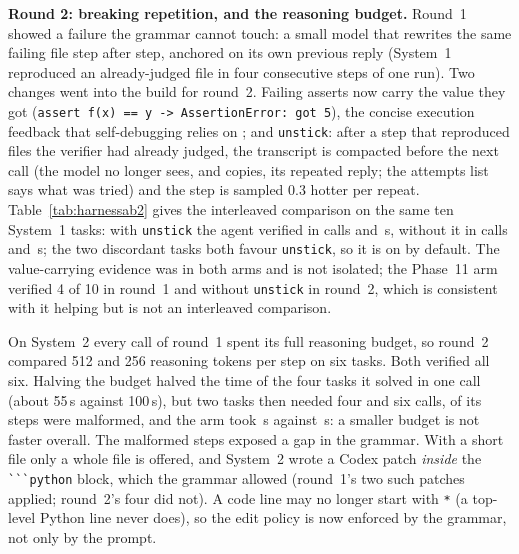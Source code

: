 \textbf{Round 2: breaking repetition, and the reasoning budget.} Round~1 showed
a failure the grammar cannot touch: a small model that rewrites the same failing
file step after step, anchored on its own previous reply (System~1 reproduced
an already-judged file in four consecutive steps of one run). Two changes went
into the build for round~2. Failing asserts now carry the value they got
(\texttt{assert f(x) == y -> AssertionError: got 5}), the concise execution
feedback that self-debugging relies on \cite{chen2024selfdebug}; and
\texttt{unstick}: after a step that reproduced files the verifier had already
judged, the transcript is compacted before the next call (the model no longer
sees, and copies, its repeated reply; the attempts list says what was tried) and
the step is sampled 0.3 hotter per repeat. Table~\ref{tab:harnessab2} gives the
interleaved comparison on the same ten System~1 tasks: with \texttt{unstick} the
agent verified \HABROneUVerified{} in \HABROneUCalls{} calls and \HABROneUWall\,s,
without it \HABROneNoUVerified{} in \HABROneNoUCalls{} calls and
\HABROneNoUWall\,s; the two discordant tasks both favour \texttt{unstick}, so it is
on by default. The value-carrying evidence was in both arms and is not isolated;
the Phase~11 arm verified 4 of 10 in round~1 and \HABROneNoUVerified{} without
\texttt{unstick} in round~2, which is consistent with it helping but is not an
interleaved comparison.

On System~2 every call of round~1 spent its full reasoning budget, so round~2
compared 512 and 256 reasoning tokens per step on six tasks. Both verified all
six. Halving the budget halved the time of the four tasks it solved in one call
(about 55\,s against 100\,s), but two tasks then needed four and six calls, \HABRTwoSmallMalformed{}
of its \HABRTwoSmallActions{} steps were malformed, and the arm took
\HABRTwoSmallWall\,s against \HABRTwoBigWall\,s: a smaller budget is not faster
overall. The malformed steps exposed a gap in the grammar. With a short file only
a whole file is offered, and System~2 wrote a Codex patch \emph{inside} the
\verb|```python| block, which the grammar allowed (round~1's two such patches
applied; round~2's four did not). A code line may no longer start with
\texttt{*} (a top-level Python line never does), so the edit policy is now
enforced by the grammar, not only by the prompt.


